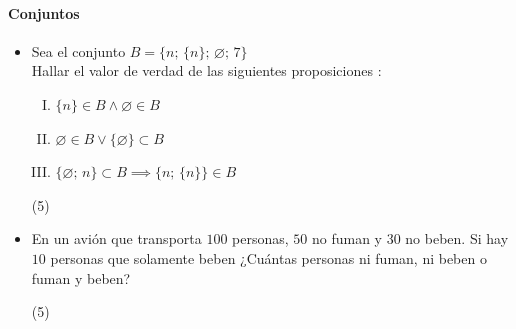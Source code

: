 \documentclass[11pt, twocolumn, landscape, a4paper]{article}
\begin{document}
\paragraph*{Conjuntos}

\begin{itemize}
\item{Sea el conjunto \quad$B = \big\{n;\,\{n\};\,\varnothing;\,7\big\}$ \\ Hallar el valor de verdad de las siguientes proposiciones :

\begin{enumerate}[I.]
\item{$\{n\} \in B \wedge \varnothing \in B$}
\item{$\varnothing \in B \vee \{\varnothing\} \subset B$}
\item{$\{\varnothing;\,n\} \subset B \implies \{n; \,\{n\}\} \in B$}
\end{enumerate}
\begin{tasks}(5)
\end{tasks}
}

\item{En un avión que transporta $100$ personas, $50$ no fuman y $30$ no beben. Si hay $10$ personas que solamente beben ¿Cuántas personas ni fuman, ni beben o fuman y beben?
\begin{tasks}(5)
\end{tasks} 
}


\end{itemize}
\end{document}
